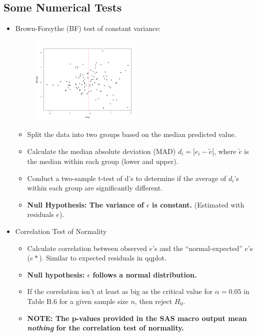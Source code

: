 \documentclass[12pt]{../notes}
\begin{document}
\subsection{Some Numerical Tests}
\begin{itemize}
\item Brown-Forsythe (BF) test of constant variance:

\begin{figure}[H]
\centering
\includegraphics[width = 0.5\textwidth]{../figures/module2/BFtest.pdf}
\end{figure}

\begin{itemize}
\item Split the data into two groups based on the median predicted value. 
\item Calculate the median absolute deviation (MAD) $d_i = |e_i - \tilde{e}|$, where $\tilde{e}$ is the median within each group (lower and upper). 
\item Conduct a two-sample t-test of d's to determine if the average of $d_i$'s within each group are significantly different.  
\item \textbf{Null Hypothesis: The variance of $\epsilon$ is constant.} (Estimated with residuals $e$).
\end{itemize}

\begin{minipage}[l][2cm][c]{\textwidth}
\end{minipage}

\item Correlation Test of Normality
\begin{itemize}
\item Calculate correlation between observed $e$'s and the ``normal-expected'' $e$'s ($e*$). Similar to expected residuals in qqplot. 
\item \textbf{Null hypothesis: $\epsilon$ follows a normal distribution.}
\item If the correlation isn't at least as big as the critical value for $\alpha=0.05$ in Table B.6 for a given sample size $n$, then reject $H_0$. 
\item \textbf{NOTE: The p-values provided in the SAS macro output mean \textit{nothing} for the correlation test of normality.} 
\end{itemize}


\end{itemize}
\end{document}
